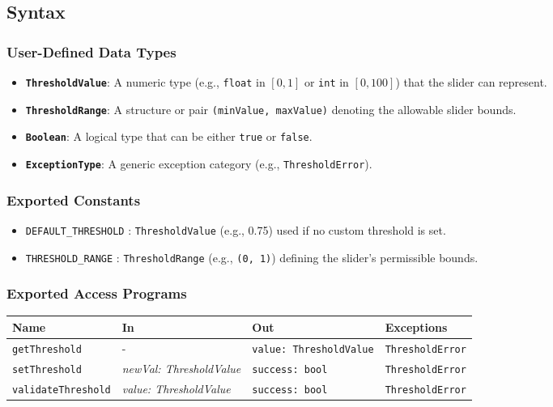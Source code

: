 \documentclass[12pt, titlepage]{article}
\begin{document}
\subsection{Syntax}

\subsubsection{User-Defined Data Types}

\begin{itemize}
    \item \textbf{\texttt{ThresholdValue}}: A numeric type (e.g., \texttt{float} in $[0,1]$ or \texttt{int} in $[0,100]$) that the slider can represent.
    \item \textbf{\texttt{ThresholdRange}}: A structure or pair \texttt{(minValue, maxValue)} denoting the allowable slider bounds.
    \item \textbf{\texttt{Boolean}}: A logical type that can be either \texttt{true} or \texttt{false}.
    \item \textbf{\texttt{ExceptionType}}: A generic exception category (e.g., \texttt{ThresholdError}).
\end{itemize}

\subsubsection{Exported Constants}

\begin{itemize}
    \item \texttt{DEFAULT\_THRESHOLD} : \texttt{ThresholdValue} (e.g., 0.75) used if no custom threshold is set.
    \item \texttt{THRESHOLD\_RANGE} : \texttt{ThresholdRange} (e.g., \texttt{(0, 1)}) defining the slider’s permissible bounds.
\end{itemize}

\subsubsection{Exported Access Programs}

\begin{center}
\begin{tabular}{p{3.5cm} p{3.8cm} p{3cm} p{2.5cm}}
\hline
\textbf{Name} & \textbf{In} & \textbf{Out} & \textbf{Exceptions} \\
\hline
\texttt{getThreshold} 
  & - 
  & \texttt{value: ThresholdValue} 
  & \texttt{ThresholdError} \\

\texttt{setThreshold} 
  & \textit{newVal: ThresholdValue}
  & \texttt{success: bool}
  & \texttt{ThresholdError} \\

\texttt{validateThreshold} 
  & \textit{value: ThresholdValue}
  & \texttt{success: bool} 
  & \texttt{ThresholdError} \\
\hline
\end{tabular}
\end{center}
\end{document}
